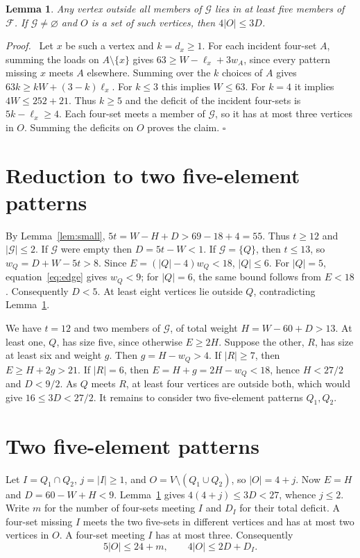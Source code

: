 \documentclass[11pt]{article}
\newtheorem{lemma}[theorem]{Lemma}
\newenvironment{proof}{\par\noindent\textit{Proof.}\ }{\hfill\(\square\)\par}
\newcommand{\F}{\mathcal F}
\newcommand{\G}{\mathcal G}
\begin{document}
\begin{lemma}\label{lem:outside}
Any vertex outside all members of \(\G\) lies in at least five members
of \(\F\). If \(\G\ne\varnothing\) and \(O\) is a set of such vertices,
then \(4|O|\le 3D\).
\end{lemma}
\begin{proof}
Let \(x\) be such a vertex and \(k=d_x\ge1\). For each incident four-set
\(A\), summing the loads on \(A\setminus\{x\}\) gives
\(63\ge W-\ell_x+3w_A\), since every pattern missing \(x\) meets
\(A\) elsewhere. Summing over the \(k\) choices of \(A\) gives
\(63k\ge kW+(3-k)\ell_x\). For \(k\le3\) this implies \(W\le63\).
For \(k=4\) it implies \(4W\le252+21\). Thus \(k\ge5\) and the
deficit of the incident four-sets is \(5k-\ell_x\ge4\).
Each four-set meets a member of \(\G\), so it has at most three vertices
in \(O\). Summing the deficits on \(O\) proves the claim.
\end{proof}

\section{Reduction to two five-element patterns}
By Lemma~\ref{lem:small}, \(5t=W-H+D>69-18+4=55\).
Thus \(t\ge12\) and \(|\G|\le2\). If \(\G\) were empty then
\(D=5t-W<1\). If \(\G=\{Q\}\), then \(t\le13\), so
\(w_Q=D+W-5t>8\). Since \(E=(|Q|-4)w_Q<18\), \(|Q|\le6\).
For \(|Q|=5\), equation~\eqref{eq:edge} gives \(w_Q<9\); for
\(|Q|=6\), the same bound follows from \(E<18\). Consequently \(D<5\).
At least eight vertices lie outside \(Q\), contradicting
Lemma~\ref{lem:outside}.

We have \(t=12\) and two members of \(\G\), of total weight
\(H=W-60+D>13\). At least one, \(Q\), has size five, since otherwise
\(E\ge2H\). Suppose the other, \(R\), has size at least six and weight
\(g\). Then \(g=H-w_Q>4\). If \(|R|\ge7\), then \(E\ge H+2g>21\).
If \(|R|=6\), then \(E=H+g=2H-w_Q<18\), hence \(H<27/2\) and
\(D<9/2\). As \(Q\) meets \(R\), at least four vertices are outside
both, which would give \(16\le 3D<27/2\).
It remains to consider two five-element patterns \(Q_1,Q_2\).

\section{Two five-element patterns}
Let \(I=Q_1\cap Q_2\), \(j=|I|\ge1\), and \(O=V\setminus(Q_1\cup Q_2)\),
so \(|O|=4+j\). Now \(E=H\) and \(D=60-W+H<9\).
Lemma~\ref{lem:outside} gives \(4(4+j)\le3D<27\), whence \(j\le2\).
Write \(m\) for the number of four-sets meeting \(I\) and \(D_I\)
for their total deficit. A four-set missing \(I\) meets the two
five-sets in different vertices and has at most two vertices in \(O\).
A four-set meeting \(I\) has at most three. Consequently
\begin{equation}\label{eq:outside}
 5|O|\le 24+m,\qquad 4|O|\le2D+D_I .
\end{equation}
\end{document}
